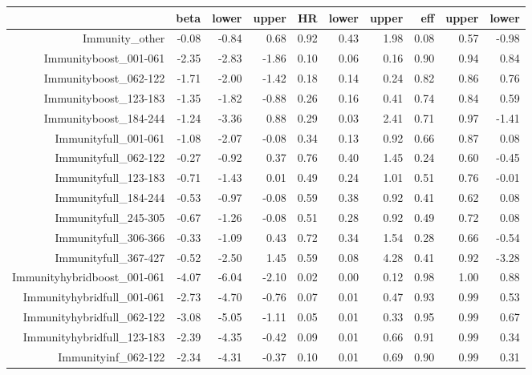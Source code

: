 \begin{table}[ht]
\centering
\begin{tabular}{rrrrrrrrrr}
  \hline
 & beta & lower & upper & HR & lower & upper & eff & upper & lower \\ 
  \hline
Immunity\_other & -0.08 & -0.84 & 0.68 & 0.92 & 0.43 & 1.98 & 0.08 & 0.57 & -0.98 \\ 
  Immunityboost\_001-061 & -2.35 & -2.83 & -1.86 & 0.10 & 0.06 & 0.16 & 0.90 & 0.94 & 0.84 \\ 
  Immunityboost\_062-122 & -1.71 & -2.00 & -1.42 & 0.18 & 0.14 & 0.24 & 0.82 & 0.86 & 0.76 \\ 
  Immunityboost\_123-183 & -1.35 & -1.82 & -0.88 & 0.26 & 0.16 & 0.41 & 0.74 & 0.84 & 0.59 \\ 
  Immunityboost\_184-244 & -1.24 & -3.36 & 0.88 & 0.29 & 0.03 & 2.41 & 0.71 & 0.97 & -1.41 \\ 
  Immunityfull\_001-061 & -1.08 & -2.07 & -0.08 & 0.34 & 0.13 & 0.92 & 0.66 & 0.87 & 0.08 \\ 
  Immunityfull\_062-122 & -0.27 & -0.92 & 0.37 & 0.76 & 0.40 & 1.45 & 0.24 & 0.60 & -0.45 \\ 
  Immunityfull\_123-183 & -0.71 & -1.43 & 0.01 & 0.49 & 0.24 & 1.01 & 0.51 & 0.76 & -0.01 \\ 
  Immunityfull\_184-244 & -0.53 & -0.97 & -0.08 & 0.59 & 0.38 & 0.92 & 0.41 & 0.62 & 0.08 \\ 
  Immunityfull\_245-305 & -0.67 & -1.26 & -0.08 & 0.51 & 0.28 & 0.92 & 0.49 & 0.72 & 0.08 \\ 
  Immunityfull\_306-366 & -0.33 & -1.09 & 0.43 & 0.72 & 0.34 & 1.54 & 0.28 & 0.66 & -0.54 \\ 
  Immunityfull\_367-427 & -0.52 & -2.50 & 1.45 & 0.59 & 0.08 & 4.28 & 0.41 & 0.92 & -3.28 \\ 
  Immunityhybridboost\_001-061 & -4.07 & -6.04 & -2.10 & 0.02 & 0.00 & 0.12 & 0.98 & 1.00 & 0.88 \\ 
  Immunityhybridfull\_001-061 & -2.73 & -4.70 & -0.76 & 0.07 & 0.01 & 0.47 & 0.93 & 0.99 & 0.53 \\ 
  Immunityhybridfull\_062-122 & -3.08 & -5.05 & -1.11 & 0.05 & 0.01 & 0.33 & 0.95 & 0.99 & 0.67 \\ 
  Immunityhybridfull\_123-183 & -2.39 & -4.35 & -0.42 & 0.09 & 0.01 & 0.66 & 0.91 & 0.99 & 0.34 \\ 
  Immunityinf\_062-122 & -2.34 & -4.31 & -0.37 & 0.10 & 0.01 & 0.69 & 0.90 & 0.99 & 0.31 \\ 

\end{tabular}
\end{table}
